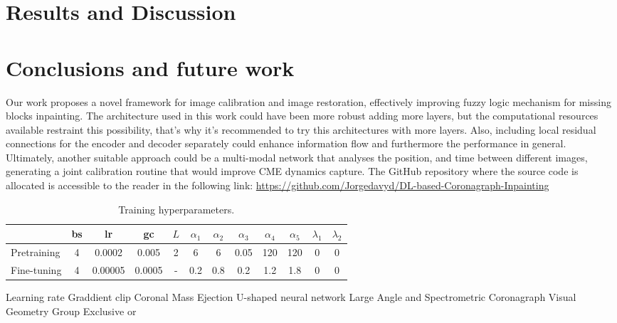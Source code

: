 \documentclass[draft]{agujournal2019}
\begin{document}
\section{Results and Discussion}


\section{Conclusions and future work}
Our work proposes a novel framework for image calibration and image restoration, effectively improving fuzzy logic mechanism for missing blocks inpainting. The architecture used in this work could have been more robust adding more layers, but the computational resources available restraint this possibility, that's why it's recommended to try this architectures with more layers. Also, including local residual connections for the encoder and decoder separately could enhance information flow and furthermore the performance in general. Ultimately, another suitable approach could be a multi-modal network that analyses the position, and time between different images, generating a joint calibration routine that would improve CME dynamics capture. The GitHub repository where the source code is allocated is accessible to the reader in the following link: \url{https://github.com/Jorgedavyd/DL-based-Coronagraph-Inpainting}

\begin{table}
 \caption{Training hyperparameters.}
 \label{tab: example}
 \centering
 \begin{tabular}{l c c c c c c c c c c c}
 \hline
    & bs& lr & gc & $L$ & $\alpha_1$ & $\alpha_2$ & $\alpha_3$ & $\alpha_4$ & $\alpha_5$ & $\lambda_1$ & $\lambda_2$  \\
 \hline
   Pretraining  & 4 & 0.0002 & 0.005 & 2 & 6 & 6 & 0.05 & 120 & 120 & 0 & 0 \\
   Fine-tuning  & 4 & 0.00005 & 0.0005 & - & 0.2 & 0.8 & 0.2 & 1.2 & 1.8 & 0 & 0   \\
 \hline
 \end{tabular}
 \end{table}
\begin{acronyms}
Learning rate
Graddient clip
Coronal Mass Ejection
U-shaped neural network
Large Angle and Spectrometric Coronagraph
Visual Geometry Group
Exclusive or
\end{acronyms}
\end{document}
